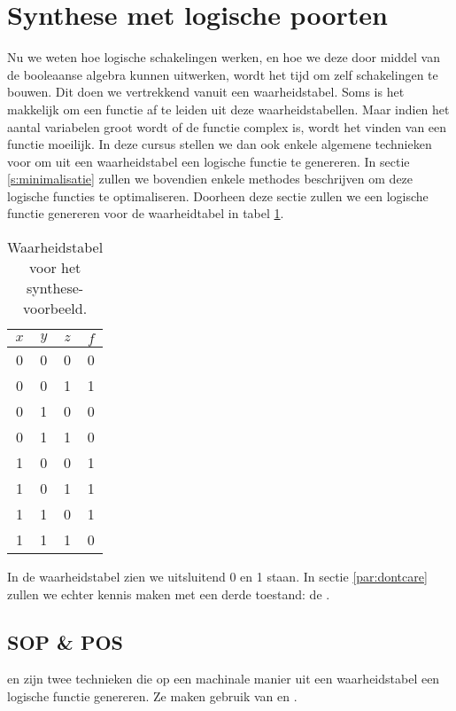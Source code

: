 \section{Synthese met logische poorten}
\label{s:synthese}
Nu we weten hoe logische schakelingen werken, en hoe we deze door middel van de booleaanse algebra kunnen uitwerken, wordt het tijd om zelf schakelingen te bouwen. Dit doen we vertrekkend vanuit een waarheidstabel. Soms is het makkelijk om een functie af te leiden uit deze waarheidstabellen. Maar indien het aantal variabelen groot wordt of de functie complex is, wordt het vinden van een functie moeilijk. In deze cursus stellen we dan ook enkele algemene technieken voor om uit een waarheidstabel een logische functie te genereren. In sectie \ref{s:minimalisatie} zullen we bovendien enkele methodes beschrijven om deze logische functies te optimaliseren. Doorheen deze sectie zullen we een logische functie genereren voor de waarheidtabel in tabel \ref{tbl:truthTableExample}.
\begin{table}[htb]
\centering
\begin{tabular}{ccc|c}
$x$&$y$&$z$&$f$\\\hline
0&0&0&0\\
0&0&1&1\\
0&1&0&0\\
0&1&1&0\\
1&0&0&1\\
1&0&1&1\\
1&1&0&1\\
1&1&1&0\\
\end{tabular}
\caption{Waarheidstabel voor het synthese-voorbeeld.}
\label{tbl:truthTableExample}
\end{table}
In de waarheidstabel zien we uitsluitend 0 en 1 staan. In sectie \ref{par:dontcare} zullen we echter kennis maken met een derde toestand: de .
\subsection{SOP \& POS}
 en  zijn twee technieken die op een machinale manier uit een waarheidstabel een logische functie genereren. Ze maken gebruik van  en .
